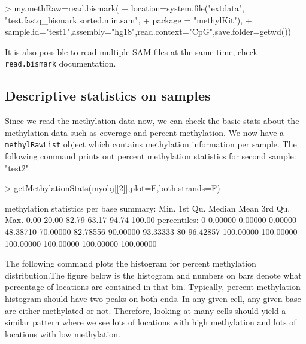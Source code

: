 \documentclass{article}
\begin{document}
\begin{Schunk}
\begin{Sinput}
> my.methRaw=read.bismark(
+ 	   location=system.file("extdata", "test.fastq_bismark.sorted.min.sam", 
+ 	                    package = "methylKit"),
+              sample.id="test1",assembly="hg18",read.context="CpG",save.folder=getwd())
\end{Sinput}
\end{Schunk}

It is also possible to read multiple SAM files at the same time, check \texttt{read.bismark} documentation.


\subsection{Descriptive statistics on samples}
Since we read the methylation data now, we can check the basic stats about the methylation data such as coverage and percent  methylation. We now have a \texttt{methylRawList} object which contains methylation information per sample. The following command prints out percent methylation statistics for second sample: "test2"

\begin{Schunk}
\begin{Sinput}
> getMethylationStats(myobj[[2]],plot=F,both.strands=F)
\end{Sinput}
\begin{Soutput}
methylation statistics per base
summary:
   Min. 1st Qu.  Median    Mean 3rd Qu.    Max. 
   0.00   20.00   82.79   63.17   94.74  100.00 
percentiles:
       0%       10%       20%       30%       40%       50%       60%       70% 
  0.00000   0.00000   0.00000  48.38710  70.00000  82.78556  90.00000  93.33333 
      80%       90%       95%       99%     99.5%     99.9%      100% 
 96.42857 100.00000 100.00000 100.00000 100.00000 100.00000 100.00000 
\end{Soutput}
\end{Schunk}

The following command plots the histogram for percent methylation distribution.The figure below is the histogram and numbers on bars denote what percentage of locations are contained in that bin. Typically, percent methylation histogram should have two peaks on both ends. In any given cell, any given base are either methylated or not. Therefore, looking at many cells should yield a similar pattern where we see lots of locations with high methylation and lots of locations with low methylation.
\end{document}
